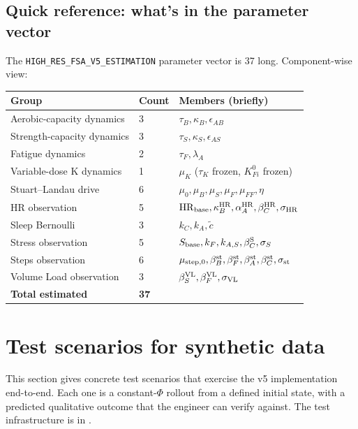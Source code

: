 \documentclass[11pt,a4paper]{article}
\theoremstyle{definition}
\begin{document}
\subsection{Quick reference: what's in the parameter vector}

The \texttt{HIGH\_RES\_FSA\_V5\_ESTIMATION} parameter vector is 37 long.
Component-wise view:

\begin{center}\small
\begin{tabular}{lll}
\toprule
Group & Count & Members (briefly) \\
\midrule
Aerobic-capacity dynamics  & 3  & $\tau_B, \kappa_B, \epsilon_{AB}$ \\
Strength-capacity dynamics & 3  & $\tau_S, \kappa_S, \epsilon_{AS}$ \\
Fatigue dynamics           & 2  & $\tau_F, \lambda_A$ \\
Variable-dose K dynamics   & 1  & $\mu_K$ ($\tau_K$ frozen, $K^0_{Fi}$ frozen) \\
Stuart--Landau drive       & 6  & $\mu_0, \mu_B, \mu_S, \mu_F, \mu_{FF}, \eta$ \\
HR observation             & 5  & ${\rm HR}_{\rm base}, \kappa_B^{\rm HR}, \alpha_A^{\rm HR}, \beta_C^{\rm HR}, \sigma_{\rm HR}$ \\
Sleep Bernoulli            & 3  & $k_C, k_A, \tilde c$ \\
Stress observation         & 5  & $S_{\rm base}, k_F, k_{A,S}, \beta_C^{\rm S}, \sigma_S$ \\
Steps observation          & 6  & $\mu_{\rm step,0}, \beta_B^{\rm st}, \beta_F^{\rm st}, \beta_A^{\rm st}, \beta_C^{\rm st}, \sigma_{\rm st}$ \\
Volume Load observation    & 3  & $\beta_S^{\rm VL}, \beta_F^{\rm VL}, \sigma_{\rm VL}$ \\
\midrule
\textbf{Total estimated}   & \textbf{37} & \\
\bottomrule
\end{tabular}
\end{center}


\section{Test scenarios for synthetic data} \label{sec:tests}

This section gives concrete test scenarios that exercise the v5
implementation end-to-end. Each one is a constant-$\Phi$ rollout from a
defined initial state, with a predicted qualitative outcome that the
engineer can verify against. The test infrastructure is in
.
\end{document}
